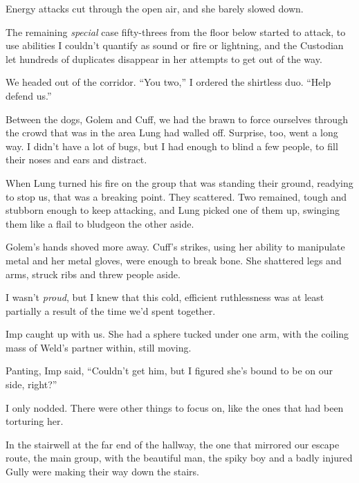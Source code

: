 Energy attacks cut through the open air, and she barely slowed down.



The remaining \emph{special} case fifty-threes from the floor below started to attack, to use abilities I couldn't quantify as sound or fire or lightning, and the Custodian let hundreds of duplicates disappear in her attempts to get out of the way.



We headed out of the corridor.  ``You two,'' I ordered the shirtless duo.  ``Help defend us.''



Between the dogs, Golem and Cuff, we had the brawn to force ourselves through the crowd that was in the area Lung had walled off.  Surprise, too, went a long way.  I didn't have a lot of bugs, but I had enough to blind a few people, to fill their noses and ears and distract.



When Lung turned his fire on the group that was standing their ground, readying to stop us, that was a breaking point.  They scattered.  Two remained, tough and stubborn enough to keep attacking, and Lung picked one of them up, swinging them like a flail to bludgeon the other aside.



Golem's hands shoved more away.  Cuff's strikes, using her ability to manipulate metal and her metal gloves, were enough to break bone.  She shattered legs and arms, struck ribs and threw people aside.



I wasn't \emph{proud}, but I knew that this cold, efficient ruthlessness was at least partially a result of the time we'd spent together.



Imp caught up with us.  She had a sphere tucked under one arm, with the coiling mass of Weld's partner within, still moving.



Panting, Imp said, ``Couldn't get him, but I figured she's bound to be on our side, right?''



I only nodded.  There were other things to focus on, like the ones that had been torturing her.



In the stairwell at the far end of the hallway, the one that mirrored our escape route, the main group, with the beautiful man, the spiky boy and a badly injured Gully were making their way down the stairs.



